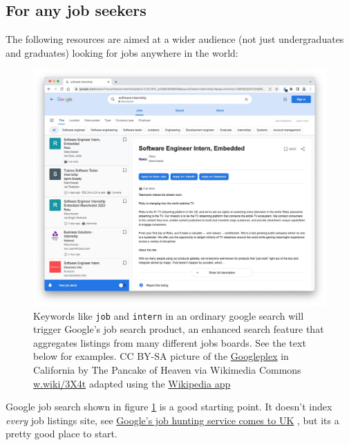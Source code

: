 \documentclass[
]{book}
\begin{document}
\hypertarget{generaljobs}{%
\subsection{For any job seekers}\label{generaljobs}}

The following resources are aimed at a wider audience (not just undergraduates and graduates) looking for jobs anywhere in the world:

\begin{figure}

{\centering \includegraphics[width=0.9\linewidth]{images/google-job-search} 

}

\caption{Keywords like \texttt{job} and \texttt{intern} in an ordinary google search will trigger Google's job search product, an enhanced search feature that aggregates listings from many different jobs boards. See the text below for examples. CC BY-SA picture of the \href{https://en.wikipedia.org/wiki/Googleplex}{Googleplex} in California by The Pancake of Heaven via Wikimedia Commons \href{https://w.wiki/3X4t}{w.wiki/3X4t} adapted using the \href{https://apps.apple.com/us/app/wikipedia/id324715238}{Wikipedia app}}\label{fig:googlejobs-fig}
\end{figure}



Google job search shown in figure \ref{fig:googlejobs-fig} is a good starting point. It doesn't index \emph{every} job listings site, see \href{https://www.bbc.co.uk/news/technology-44853472}{Google's job hunting service comes to UK} \citep{noindeed}, but its a pretty good place to start.
\end{document}
